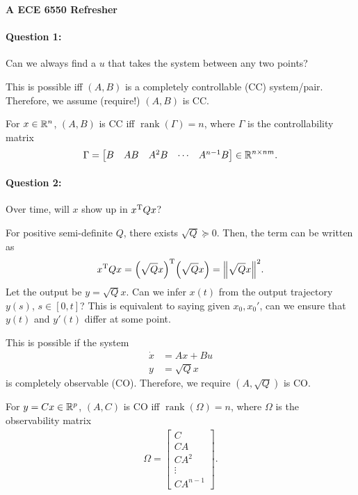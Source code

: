 \begin{oframed}
\noindent\textbf{\large A ECE 6550 Refresher}
\paragraph{Question 1:} Can we always find a $u$ that takes the system between any two points?

This is possible iff $(A,B)$ is a completely controllable (CC) system/pair. Therefore, we assume (require!) $(A,B)$ is CC.

\begin{defi}
  For $x\in\mathbb{R}^n$, $(A,B)$ is CC iff $\mathop\text{rank}(\Gamma)=n$, where $\Gamma$ is the controllability matrix
  \begin{gather}
    \Gamma = \begin{bmatrix}
      B & AB & A^2B & \cdots & A^{n-1}B
    \end{bmatrix} \in\mathbb{R}^{n\times nm}.
  \end{gather}
\end{defi}

\paragraph{Question 2:} Over time, will $x$ show up in $x^\text{T} Qx$?

For positive semi-definite $Q$, there exists $\sqrt{Q}\succeq0$. Then, the term can be written as
\begin{gather}
  x^\text{T} Q x = \Big(\sqrt{Q}x\Big)^\text{T} \Big(\sqrt{Q}x\Big) = \Big\Vert\sqrt{Q}x\Big\Vert^2.
\end{gather}
Let the output be $y=\sqrt{Q}x$. Can we infer $x(t)$ from the output trajectory $y(s)$, $s\in[0,t]$? This is equivalent to saying given $x_0,x_0'$, can we ensure that $y(t)$ and $y'(t)$ differ at some point.

This is possible if the system
\begin{align}
  \dot x &= Ax + Bu \\
  y &= \sqrt{Q} x
\end{align}
is completely observable (CO). Therefore, we require $(A,\sqrt{Q})$ is CO.

\begin{defi}
  For $y=Cx\in\mathbb{R}^p$, $(A,C)$ is CO iff $\mathop\text{rank}(\Omega)=n$, where $\Omega$ is the observability matrix
  \begin{gather}
    \Omega = \begin{bmatrix}
      C \\ CA \\ CA^2 \\ \vdots \\ CA^{n-1}
    \end{bmatrix}.
  \end{gather}
\end{defi}
\end{oframed}

